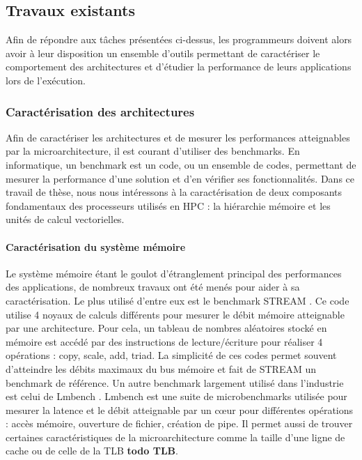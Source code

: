     \subsection{Travaux existants}
    
        Afin de répondre aux tâches présentées ci-dessus, les programmeurs doivent alors avoir à leur disposition un ensemble d'outils permettant de caractériser le comportement des architectures et d'étudier la performance de leurs applications lors de l'exécution.
        
        
        \subsubsection{Caractérisation des architectures}
            
            Afin de caractériser les architectures et de mesurer les performances atteignables par la microarchitecture, il est courant d'utiliser des benchmarks. En informatique, un benchmark est un code, ou un ensemble de codes, permettant de mesurer la performance d'une solution et d'en vérifier ses fonctionnalités. Dans ce travail de thèse, nous nous intéressons à la caractérisation de deux composants fondamentaux des processeurs utilisés en HPC : la hiérarchie mémoire et les unités de calcul vectorielles. 
            
            \paragraph{Caractérisation du système mémoire} 
            
                Le système mémoire étant le goulot d'étranglement principal des performances des applications, de nombreux travaux ont été menés pour aider à sa caractérisation. Le plus utilisé d'entre eux est le benchmark STREAM \cite{McCalpin1995}. Ce code utilise 4 noyaux de calculs différents pour mesurer le débit mémoire atteignable par une architecture. Pour cela, un tableau de nombres aléatoires stocké en mémoire est accédé par des instructions de lecture/écriture pour réaliser 4 opérations : copy, scale, add, triad. La simplicité de ces codes permet souvent d'atteindre les débits maximaux du bus mémoire et fait de STREAM un benchmark de référence. Un autre benchmark largement utilisé dans l'industrie est celui de Lmbench \cite{Staelin2004}. Lmbench est une suite de microbenchmarks utilisée pour mesurer la latence et le débit atteignable par un cœur pour différentes opérations : accès mémoire, ouverture de fichier, création de pipe. Il permet aussi de trouver certaines caractéristiques de la microarchitecture comme la taille d'une ligne de cache ou de celle de la TLB \textbf{todo TLB}.
                
